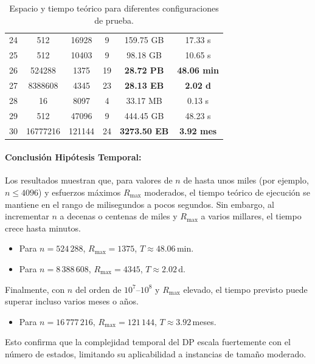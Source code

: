 \documentclass[11pt,letter]{article}
\begin{document}
\begin{itemize}
\begin{table}[H]
\begin{tabular}{|c|c|c|c|c|c|}
    24 & 512 & 16928 & 9 & 159.75 GB & 17.33 s \\
    25 & 512 & 10403 & 9 & 98.18 GB & 10.65 s \\
    26 & 524288 & 1375 & 19 & \cellcolor{yellow}\textbf{28.72 PB} & \cellcolor{yellow}\textbf{48.06 min} \\
    27 & 8388608 & 4345 & 23 & \cellcolor{yellow}\textbf{28.13 EB} & \cellcolor{yellow}\textbf{2.02 d} \\
    28 & 16 & 8097 & 4 & 33.17 MB & 0.13 s \\
    29 & 512 & 47096 & 9 & 444.45 GB & 48.23 s \\
    30 & 16777216 & 121144 & 24 & \cellcolor{yellow}\textbf{3273.50 EB} & \cellcolor{yellow}\textbf{3.92 mes} \\
    \hline
    \end{tabular}
    \caption{Espacio y tiempo teórico para diferentes configuraciones de prueba.}
    \end{table}




       \paragraph{Conclusión Hipótesis Temporal:}
    Los resultados muestran que, para valores de \(n\) de hasta unos miles (por ejemplo, \(n \le 4096\)) y esfuerzos máximos \(R_{\max}\) moderados, el tiempo teórico de ejecución se mantiene en el rango de milisegundos a pocos segundos. Sin embargo, al incrementar \(n\) a decenas o centenas de miles y \(R_{\max}\) a varios millares, el tiempo crece hasta minutos.

    \begin{itemize}
      \item Para \(n=524\,288\), \(R_{\max}=1375\), \(T\approx48.06\)\,min.
      \item Para \(n=8\,388\,608\), \(R_{\max}=4345\), \(T\approx2.02\)\,d.
    \end{itemize}

    Finalmente, con \(n\) del orden de \(10^7\)–\(10^8\) y \(R_{\max}\) elevado, el tiempo previsto puede superar incluso varios meses o años.

    \begin{itemize}
      \item Para \(n=16\,777\,216\), \(R_{\max}=121\,144\), \(T\approx3.92\)\,meses.
    \end{itemize}

    Esto confirma que la complejidad temporal del DP escala fuertemente con el número de estados, limitando su aplicabilidad a instancias de tamaño moderado.


\end{itemize}
\end{document}
